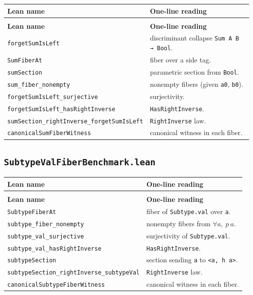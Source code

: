 \documentclass[11pt]{article}
\begin{document}
{\footnotesize
\begin{longtable}{@{}>{\raggedright\arraybackslash}p{}>{\raggedright\arraybackslash}p{}@{}}
\toprule
\textbf{Lean name} & \textbf{One-line reading} \\
\midrule
\endfirsthead
\multicolumn{2}{c}{\textit{(continued)}} \\
\toprule
\textbf{Lean name} & \textbf{One-line reading} \\
\midrule
\endhead
\bottomrule
\endfoot

\texttt{forgetSumIsLeft} & discriminant collapse \texttt{Sum A B → Bool}. \\
\texttt{SumFiberAt} & fiber over a side tag. \\
\texttt{sumSection} & parametric section from \texttt{Bool}. \\
\texttt{sum\_fiber\_nonempty} & nonempty fibers (given \texttt{a0}, \texttt{b0}). \\
\texttt{forgetSumIsLeft\_surjective} & surjectivity. \\
\texttt{forgetSumIsLeft\_hasRightInverse} & \texttt{HasRightInverse}. \\
\texttt{sumSection\_rightInverse\_forgetSumIsLeft} & \texttt{RightInverse} law. \\
\texttt{canonicalSumFiberWitness} & canonical witness in each fiber. \\

\end{longtable}
}

\subsection*{\texttt{SubtypeValFiberBenchmark.lean}}

{\footnotesize
\begin{longtable}{@{}>{\raggedright\arraybackslash}p{}>{\raggedright\arraybackslash}p{}@{}}
\toprule
\textbf{Lean name} & \textbf{One-line reading} \\
\midrule
\endfirsthead
\multicolumn{2}{c}{\textit{(continued)}} \\
\toprule
\textbf{Lean name} & \textbf{One-line reading} \\
\midrule
\endhead
\bottomrule
\endfoot

\texttt{SubtypeFiberAt} & fiber of \texttt{Subtype.val} over \texttt{a}. \\
\texttt{subtype\_fiber\_nonempty} & nonempty fibers from $\forall a,\ p\ a$. \\
\texttt{subtype\_val\_surjective} & surjectivity of \texttt{Subtype.val}. \\
\texttt{subtype\_val\_hasRightInverse} & \texttt{HasRightInverse}. \\
\texttt{subtypeSection} & section sending \texttt{a} to \texttt{<a, h a>}. \\
\texttt{subtypeSection\_rightInverse\_subtypeVal} & \texttt{RightInverse} law. \\
\texttt{canonicalSubtypeFiberWitness} & canonical witness in each fiber. \\

\end{longtable}
}
\end{document}
